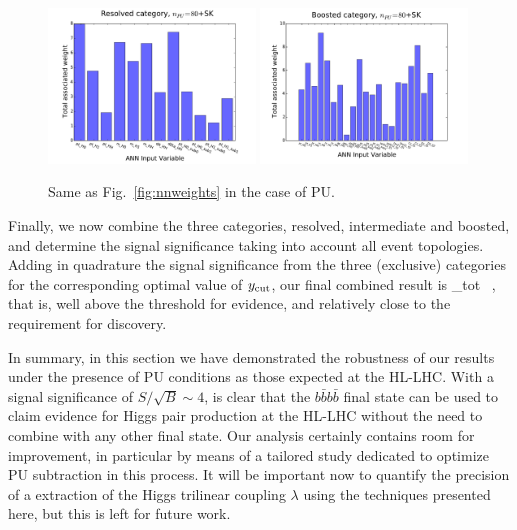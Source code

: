 \begin{figure}[t]
\begin{center}
\includegraphics[width=0.49\textwidth]{plots/res_wgthist_SKPU80.pdf}
\includegraphics[width=0.49\textwidth]{plots/bst_wgthist_SKPU80.pdf}
\vspace{-0.5cm}
\caption{\small
Same as Fig.~\ref{fig:nnweights} in the case of PU.
}
\label{fig:nnweights_PU}
\end{center}
\end{figure}




Finally, we now combine the three categories, resolved,
intermediate and boosted, and determine the signal
significance taking into account all event topologies.
%
Adding in quadrature the signal significance from the three
(exclusive) categories for the corresponding
optimal value of $y_{\rm cut}$, our final combined result is
\be
\lp {}\rp_{\rm tot}  \, ,
\ee
that is, well
above the threshold for evidence, and  relatively close to the
requirement for discovery.
%

In summary, in this section we have demonstrated the robustness
of our results under the presence of PU conditions as those
expected at the HL-LHC.
%
With a signal significance of $S/\sqrt{B}\sim 4$, is clear that
the $b\bar{b}b\bar{b}$ final state can be used to claim evidence
for Higgs pair production at the HL-LHC without the need
to combine with any other final state.
%
Our analysis certainly contains
room for improvement, in particular by means of a tailored
study dedicated to optimize PU subtraction in this process.
%
It will be important now to quantify the precision of
a extraction of the Higgs trilinear coupling $\lambda$ using
the techniques presented here, but this is left for future work.

